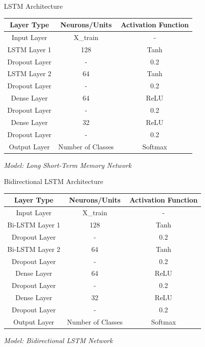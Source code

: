 \begin{frame}{LSTM Architecture}
	\centering
	\small
	\begin{tabular}{|c|c|c|}
		\hline
		\textbf{Layer Type} & \textbf{Neurons/Units} & \textbf{Activation Function} \\
		\hline
		Input Layer & X\_train & - \\
		\hline
		LSTM Layer 1 & 128 & Tanh \\
		\hline
		Dropout Layer & - & 0.2 \\
		\hline
		LSTM Layer 2 & 64 & Tanh \\
		\hline
		Dropout Layer & - & 0.2 \\
		\hline
		Dense Layer & 64 & ReLU \\
		\hline
		Dropout Layer & - & 0.2 \\
		\hline
		Dense Layer & 32 & ReLU \\
		\hline
		Dropout Layer & - & 0.2 \\
		\hline
		Output Layer & Number of Classes & Softmax \\
		\hline
	\end{tabular}
	
	\vspace{1em}
	\textit{Model: Long Short-Term Memory Network}
\end{frame}


\begin{frame}{Bidirectional LSTM Architecture}
	\centering
	\small
	\begin{tabular}{|c|c|c|}
		\hline
		\textbf{Layer Type} & \textbf{Neurons/Units} & \textbf{Activation Function} \\
		\hline
		Input Layer & X\_train & - \\
		\hline
		Bi-LSTM Layer 1 & 128 & Tanh \\
		\hline
		Dropout Layer & - & 0.2 \\
		\hline
		Bi-LSTM Layer 2 & 64 & Tanh \\
		\hline
		Dropout Layer & - & 0.2 \\
		\hline
		Dense Layer & 64 & ReLU \\
		\hline
		Dropout Layer & - & 0.2 \\
		\hline
		Dense Layer & 32 & ReLU \\
		\hline
		Dropout Layer & - & 0.2 \\
		\hline
		Output Layer & Number of Classes & Softmax \\
		\hline
	\end{tabular}
	
	\vspace{1em}
	\textit{Model: Bidirectional LSTM Network}
\end{frame}
